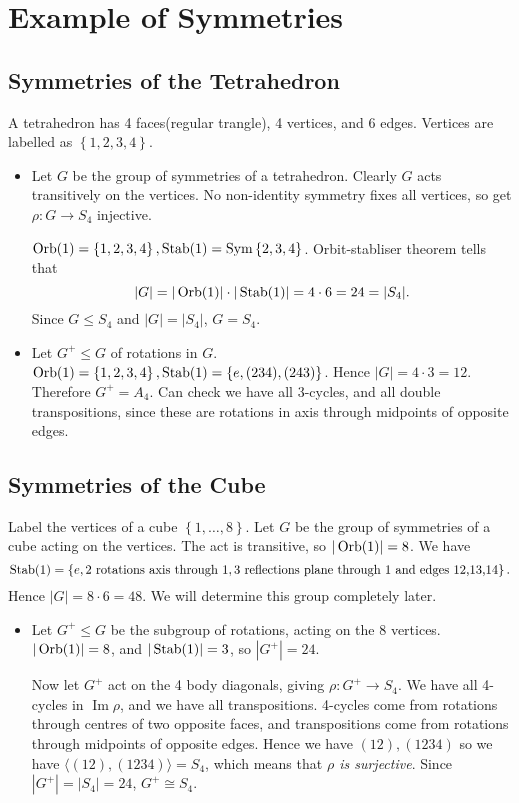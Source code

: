 \documentclass[10pt]{article}
\DeclareMathOperator{\im}{Im}
\def\le{\leqslant}
\DeclareMathOperator{\sym}{Sym}
\begin{document}
    \section{Example of Symmetries}
    \subsection{Symmetries of the Tetrahedron}
    A tetrahedron has 4 faces(regular trangle), 4 vertices, and 6 edges. Vertices are labelled as $ \left\{ 1,2,3,4 \right\} $.

    \begin{itemize}
        \item Let $G$ be the group of symmetries of a tetrahedron. Clearly $G$ acts transitively on the vertices. No non-identity symmetry fixes all vertices, so get $ \rho:G \to S_4 $ injective.

        $ \orb(1)=\left\{ 1,2,3,4 \right\}, \stab(1)=\sym\left\{ 2,3,4 \right\} $. Orbit-stabliser theorem tells that 
        \[
            |G|=|\operatorname{Orb}(1)|\cdot |\operatorname{Stab}(1)| = 4\cdot 6 = 24 = |S_4|
        .\]
        Since $ G \le S_4 $ and $ |G|=|S_4| $, $ G=S_4 $.
        \item Let $ G^+\le G $ of rotations in $G$. $ \operatorname{Orb}(1)=\left\{ 1,2,3,4 \right\}, \operatorname{Stab}(1)=\left\{ e, (234),(243) \right\} $. Hence $ |G|=4\cdot 3 = 12 $. Therefore $ G^+=A_4 $. Can check we have all 3-cycles, and all double transpositions, since these are rotations in axis through midpoints of opposite edges.
    \end{itemize}
    \subsection{Symmetries of the Cube}
    Label the vertices of a cube $ \left\{ 1,\dots,8 \right\} $. Let $G$ be the group of symmetries of a cube acting on the vertices. The act is transitive, so $ |\operatorname{Orb}(1)|=8 $. We have 
    \[
        \operatorname{Stab}(1)=\left\{ e,\text{2 rotations axis through 1}, \text{3 reflections plane through 1 and edges 12,13,14} \right\}
    .\]
    Hence $ |G|=8\cdot 6=48. $ We will determine this group completely later.
    \begin{itemize}
        \item Let $ G^+ \le G$ be the subgroup of rotations, acting on the 8 vertices. $ |\operatorname{Orb}(1)|=8 $, and $ |\operatorname{Stab}(1)|=3 $, so $ |G^+|=24 $.

        Now let $ G^+ $ act on the 4 body diagonals, giving $ \rho:G^+\to S_4 $. We have all 4-cycles in $ \im \rho $, and we have all transpositions. 4-cycles come from rotations through centres of two opposite faces, and transpositions come from rotations through midpoints of opposite edges. Hence we have $ (12),(1234) $ so we have $ \langle (12),(1234) \rangle =S_4 $, which means that \textit{$ \rho $ is surjective}. Since $ |G^+|=|S_4|=24 $, $ G^+\cong S_4 $.
    \end{itemize}
\end{document}

